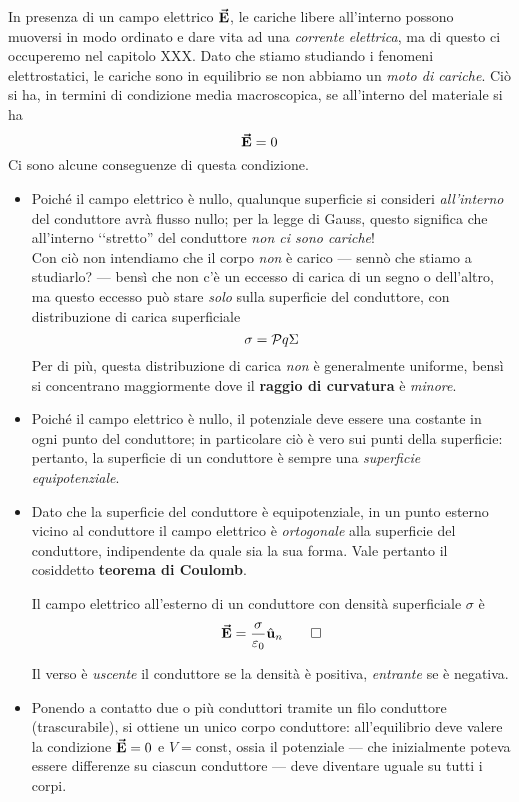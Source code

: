 In presenza di un campo elettrico $\vb*{\va{E}}$, le cariche libere all'interno possono muoversi in modo ordinato e dare vita ad una \textit{corrente elettrica}, ma di questo ci occuperemo nel capitolo XXX. Dato che stiamo studiando i fenomeni elettrostatici, le cariche sono in equilibrio se non abbiamo un \textit{moto di cariche}. Ciò si ha, in termini di condizione media macroscopica, se all'interno del materiale si ha
\begin{equation}
	\vb*{\va{E}}=0
\end{equation}
Ci sono alcune conseguenze di questa condizione.
\begin{itemize}
	\item Poiché il campo elettrico è nullo, qualunque superficie si consideri \textit{all'interno} del conduttore avrà flusso nullo; per la legge di Gauss, questo significa che all'interno ‘‘stretto'' del conduttore \textit{non ci sono cariche}!\\
	Con ciò non intendiamo che il corpo \textit{non} è carico --- sennò che stiamo a studiarlo? --- bensì che non c'è un eccesso di carica di un segno o dell'altro, ma questo eccesso può stare \textit{solo} sulla superficie del conduttore, con distribuzione di carica superficiale
	\begin{equation*}
		\sigma=\pv{q}{\Sigma}
	\end{equation*}
	Per di più, questa distribuzione di carica \textit{non} è generalmente uniforme, bensì si concentrano maggiormente dove il \textbf{raggio di curvatura} è \textit{minore}.
	\item Poiché il campo elettrico è nullo, il potenziale deve essere una costante in ogni punto del conduttore; in particolare ciò è vero sui punti della superficie: pertanto, la superficie di un conduttore è sempre una \textit{superficie equipotenziale}.
	\item Dato che la superficie del conduttore è equipotenziale, in un punto esterno vicino al conduttore il campo elettrico è \textit{ortogonale} alla superficie del conduttore, indipendente da quale sia la sua forma. Vale pertanto il cosiddetto \textbf{teorema di Coulomb}.
	\begin{theoremaqed}
		Il campo elettrico all'esterno di un conduttore con densità superficiale $\sigma$ è
		\begin{equation}
			\vb*{\va{E}}=\frac{\sigma}{\varepsilon_0}\hat{\mathbf{u}}_n\qedhere
		\end{equation}
	\end{theoremaqed}
	Il verso è \textit{uscente} il conduttore se la densità è positiva, \textit{entrante} se è negativa.
	\item Ponendo a contatto due o più conduttori tramite un filo conduttore (trascurabile), si ottiene un unico corpo conduttore: all'equilibrio deve valere la condizione $\vb*{\va{E}}=0$ e $V=\text{const}$, ossia il potenziale --- che inizialmente poteva essere differenze su ciascun conduttore --- deve diventare uguale su tutti i corpi.
	

\end{itemize}

